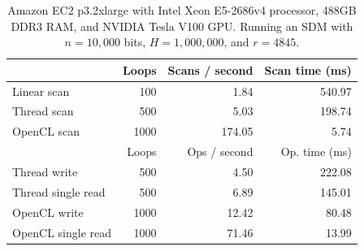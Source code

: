 \begin{table}[!htb]
\centering
\begin{tabular}{| l | r | r | r |}
    \hline
    & Loops & Scans / second & Scan time (ms) \\ \hline
    Linear scan & 100 & 1.84 & 540.97 \\
    Thread scan & 500 & 5.03 & 198.74 \\
    OpenCL scan & 1000 & 174.05 & 5.74 \\ \hline
    \hline
    & Loops & Ops / second & Op. time (ms) \\ \hline
    Thread write & 500 & 4.50 & 222.08 \\
    Thread single read & 500 & 6.89 & 145.01 \\
    OpenCL write & 1000 & 12.42 & 80.48 \\
    OpenCL single read & 1000 & 71.46 & 13.99 \\
    \hline
\end{tabular}
\caption{Amazon EC2 p3.2xlarge with Intel Xeon E5-2686v4 processor, 488GB DDR3 RAM, and NVIDIA Tesla V100 GPU. Running an SDM with $n=10,000$ bits, $H=1,000,000$, and $r=4845$.}
\end{table}
